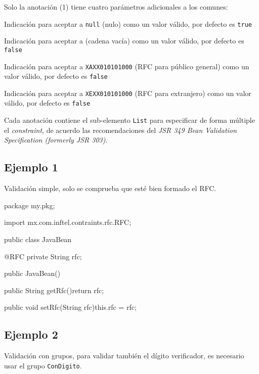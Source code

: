 \documentclass[12pt,letterpaper]{article}
\begin{document}
Solo la anotación (1) tiene cuatro parámetros adicionales a los comunes:

\begin{description}[noitemsep]
\item[isNullValueValid] Indicación para aceptar a \texttt{null} (nulo) como un valor válido, por defecto
    es \texttt{true}
\item[isEmptyValueValid] Indicación para aceptar a \texttt{\textquotedbl\textquotedbl} (cadena vacía) como un valor
    válido, por defecto es \texttt{false}
\item[isXAXX010101000ValueValid] Indicación para aceptar a \texttt{\textquotedbl{}XAXX010101000\textquotedbl}
    (RFC para público general) como un valor válido, por defecto es \texttt{false}
\item[isXEXX010101000ValueValid] Indicación para aceptar a \texttt{\textquotedbl{}XEXX010101000\textquotedbl}
    (RFC para extranjero) como un valor válido, por defecto es \texttt{false}
\end{description}

Cada anotación contiene el sub-elemento \texttt{List} para especificar de forma múltiple el \emph{constraint}, de
acuerdo las recomendaciones del \emph{JSR 349 Bean Validation Specification (formerly JSR 303)}.

\subsection{Ejemplo 1}

Validación simple, solo se comprueba que esté bien formado el RFC.

\begin{listing}{1}
package my.pkg;

import mx.com.inftel.contraints.rfc.RFC;

public class JavaBean{

    @RFC
    private String rfc;

    public JavaBean(){}

    public String getRfc(){return rfc;}

    public void setRfc(String rfc){this.rfc = rfc;}
}
\end{listing}

\subsection{Ejemplo 2}

Validación con grupos, para validar también el dígito verificador, es necesario usar el grupo \texttt{ConDigito}.
\end{document}
